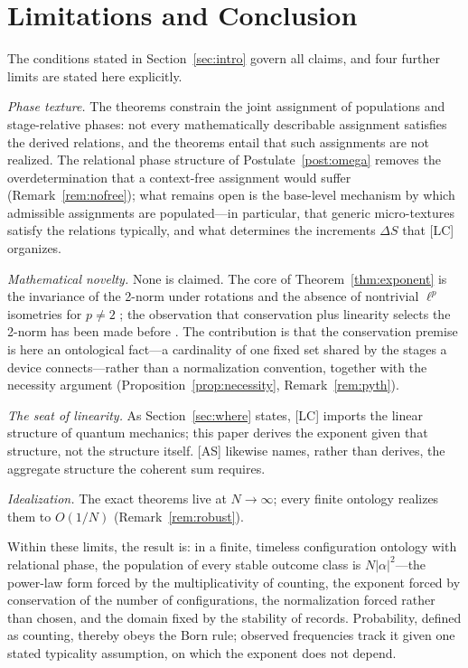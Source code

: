 \documentclass[11pt]{article}
\theoremstyle{definition}
\theoremstyle{remark}
\begin{document}
\section{Limitations and Conclusion}\label{sec:concl}
The conditions stated in Section~\ref{sec:intro} govern all claims, and four further limits are stated here explicitly.

\emph{Phase texture.} The theorems constrain the joint assignment of populations and stage-relative phases: not every mathematically describable assignment satisfies the derived relations, and the theorems entail that such assignments are not realized. The relational phase structure of Postulate~\ref{post:omega} removes the overdetermination that a context-free assignment would suffer (Remark~\ref{rem:nofree}); what remains open is the base-level mechanism by which admissible assignments are populated---in particular, that generic micro-textures satisfy the relations typically, and what determines the increments $\Delta S$ that [LC] organizes.

\emph{Mathematical novelty.} None is claimed. The core of Theorem~\ref{thm:exponent} is the invariance of the 2-norm under rotations and the absence of nontrivial $\ell^p$ isometries for $p \neq 2$ \cite{Lamperti1958}; the observation that conservation plus linearity selects the 2-norm has been made before \cite{Aaronson2004}. The contribution is that the conservation premise is here an ontological fact---a cardinality of one fixed set shared by the stages a device connects---rather than a normalization convention, together with the necessity argument (Proposition~\ref{prop:necessity}, Remark~\ref{rem:pyth}).

\emph{The seat of linearity.} As Section~\ref{sec:where} states, [LC] imports the linear structure of quantum mechanics; this paper derives the exponent given that structure, not the structure itself. [AS] likewise names, rather than derives, the aggregate structure the coherent sum requires.

\emph{Idealization.} The exact theorems live at $N \to \infty$; every finite ontology realizes them to $O(1/N)$ (Remark~\ref{rem:robust}).

Within these limits, the result is: in a finite, timeless configuration ontology with relational phase, the population of every stable outcome class is $N|\alpha|^2$---the power-law form forced by the multiplicativity of counting, the exponent forced by conservation of the number of configurations, the normalization forced rather than chosen, and the domain fixed by the stability of records. Probability, defined as counting, thereby obeys the Born rule; observed frequencies track it given one stated typicality assumption, on which the exponent does not depend.
\end{document}

